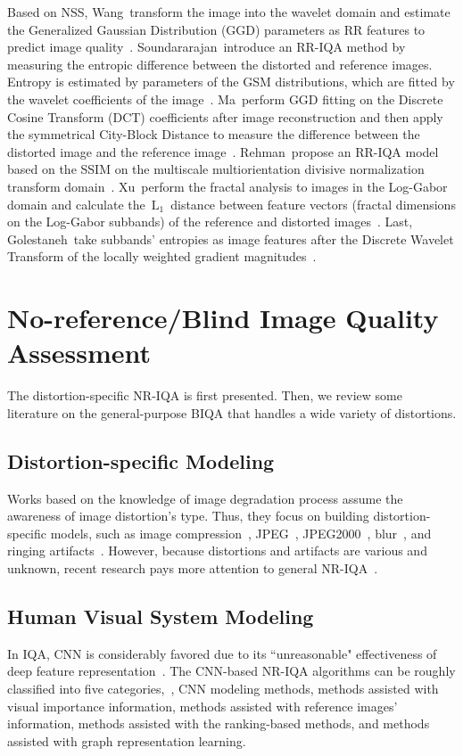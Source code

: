 Based on NSS, Wang~\etal transform the image into the wavelet domain and estimate the Generalized Gaussian Distribution (GGD) parameters as RR features to predict image quality~\citep{wang2006quality}. Soundararajan~\etal introduce an RR-IQA method by measuring the entropic difference between the distorted and reference images. Entropy is estimated by parameters of the GSM distributions, which are fitted by the wavelet coefficients of the image~\citep{soundararajan2011rred}. Ma~\etal perform GGD fitting on the Discrete Cosine Transform (DCT) coefficients after image reconstruction and then apply the symmetrical City-Block Distance to measure the difference between the distorted image and the reference image~\citep{ma2011reduced}. Rehman~\etal propose an RR-IQA model based on the SSIM on the multiscale multiorientation divisive normalization transform domain~\citep{rehman2012reduced}. Xu~\etal perform the fractal analysis to images in the Log-Gabor domain and calculate the~$\mathrm{L_1}$~distance between feature vectors (fractal dimensions on the Log-Gabor subbands) of the reference and distorted images~\citep{xu2015fractal}. Last, Golestaneh~\etal take subbands' entropies as image features after the Discrete Wavelet Transform of the locally weighted gradient magnitudes~\citep{golestaneh2016reduced}.

\section{No-reference/Blind Image Quality Assessment}
The distortion-specific NR-IQA is first presented. Then, we review some literature on the general-purpose BIQA that handles a wide variety of distortions.

\subsection{Distortion-specific Modeling}
Works based on the knowledge of image degradation process assume the awareness of image distortion's type. Thus, they focus on building distortion-specific models, such as image compression~\citep{zhu2014no, liu2018end}, JPEG~\citep{wang2002no}, JPEG2000~\citep{sheikh2005no}, blur~\citep{wang2003local}, and ringing artifacts~\citep{liu2009no}. However, because distortions and artifacts are various and unknown, recent research pays more attention to general NR-IQA~\citep{mittal2012no}.

\subsection{Human Visual System Modeling}
In IQA, CNN is considerably favored due to its ``unreasonable" effectiveness of deep feature representation~\citep{zhang2018unreasonable}. The CNN-based NR-IQA algorithms can be roughly classified into five categories,~\ie, CNN modeling methods, methods assisted with visual importance information, methods assisted with reference images' information, methods assisted with the ranking-based methods, and methods assisted with graph representation learning.

